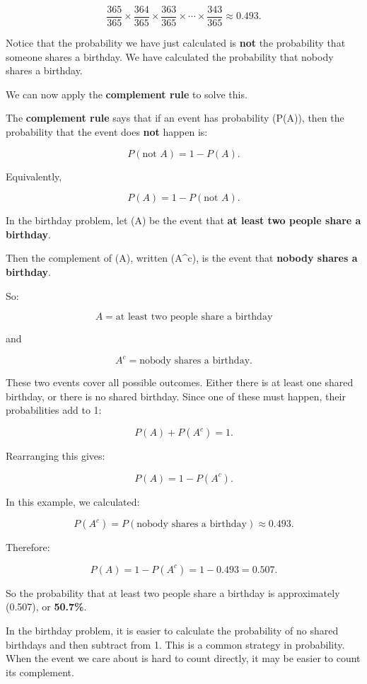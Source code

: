 \documentclass[
  letterpaper,
  DIV=11,
  numbers=noendperiod]{scrreprt}
\begin{document}
\[
\frac{365}{365}
\times
\frac{364}{365}
\times
\frac{363}{365}
\times
\cdots
\times
\frac{343}{365}
\approx 0.493.
\]

Notice that the probability we have just calculated is \textbf{not} the
probability that someone shares a birthday. We have calculated the
probability that nobody shares a birthday.

We can now apply the \textbf{complement rule} to solve this.

The \textbf{complement rule} says that if an event has probability
(P(A)), then the probability that the event does \textbf{not} happen is:

\[
P(\text{not } A) = 1 - P(A).
\]

Equivalently,

\[
P(A) = 1 - P(\text{not } A).
\]

In the birthday problem, let (A) be the event that \textbf{at least two
people share a birthday}.

Then the complement of (A), written (A\^{}c), is the event that
\textbf{nobody shares a birthday}.

So:

\[
A = \text{at least two people share a birthday}
\]

and

\[
A^c = \text{nobody shares a birthday}.
\]

These two events cover all possible outcomes. Either there is at least
one shared birthday, or there is no shared birthday. Since one of these
must happen, their probabilities add to 1:

\[
P(A) + P(A^c) = 1.
\]

Rearranging this gives:

\[
P(A) = 1 - P(A^c).
\]

In this example, we calculated:

\[
P(A^c) = P(\text{nobody shares a birthday}) \approx 0.493.
\]

Therefore:

\[
P(A)
=
1 - P(A^c)
=
1 - 0.493
=
0.507.
\]

So the probability that at least two people share a birthday is
approximately (0.507), or \textbf{50.7\%}.

In the birthday problem, it is easier to calculate the probability of no
shared birthdays and then subtract from 1. This is a common strategy in
probability. When the event we care about is hard to count directly, it
may be easier to count its complement.
\end{document}
